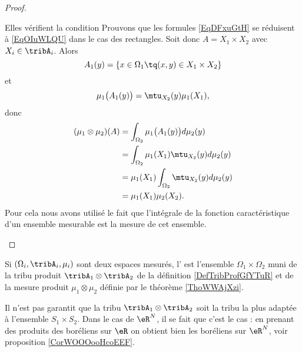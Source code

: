 \begin{proof}
\begin{subproof}
\item[Elles vérifient la condition]
    Prouvons que les formules \eqref{EqDFxuGtH} se réduisent à \eqref{EqOIuWLQU} dans le cas des rectangles. Soit donc \( A=X_1\times X_2\) avec \( X_i\in\tribA_i\). Alors
    \begin{equation}
        A_1(y)=\{ x\in\Omega_1\tq (x,y)\in X_1\times X_2 \}
    \end{equation}
    et
    \begin{equation}
        \mu_1\big( A_1(y) \big)=\mtu_{X_2}(y)\mu_1(X_1),
    \end{equation}
    donc
    \begin{subequations}
        \begin{align}
            (\mu_1\otimes\mu_2)(A)&=\int_{\Omega_2}\mu_1\big( A_1(y) \big)d\mu_2(y)\\
            &=\int_{\Omega_2}\mu_1(X_1)\mtu_{X_2}(y)d\mu_2(y)\\
            &=\mu_1(X_1)\int_{\Omega_2}\mtu_{X_2}(y)d\mu_2(y)\\
            &=\mu_1(X_1)\mu_2(X_2).
        \end{align}
    \end{subequations}
    Pour cela nous avons utilisé le fait que l'intégrale de la fonction caractéristique d'un ensemble mesurable est la mesure de cet ensemble.
    \end{subproof}
\end{proof}

\begin{definition}  \label{DefUMlBCAO}
    Si \( (\Omega_i,\tribA_i,\mu_i)\) sont deux espaces mesurés, l' est l'ensemble \( \Omega_1\times \Omega_2\) muni de la tribu produit \( \tribA_1\otimes \tribA_2\) de la définition \ref{DefTribProfGfYTuR} et de la mesure produit \( \mu_1\otimes \mu_2\) définie par le théorème \ref{ThoWWAjXzi}.
\end{definition}

\begin{remark}
    Il n'est pas garantit que la tribu \( \tribA_1\otimes\tribA_2\) soit la tribu la plus adaptée à l'ensemble \( S_1\times S_2\). Dans le cas de \( \eR^N\), il se fait que c'est le cas : en prenant des produits des boréliens sur \( \eR\) on obtient bien les boréliens sur \( \eR^N\), voir proposition \ref{CorWOOOooHcoEEF}.
\end{remark}
